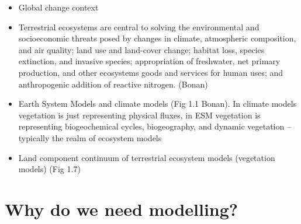 \documentclass[
  oneside]{book}
\providecommand{\tightlist}{%
  \setlength{\itemsep}{0pt}\setlength{\parskip}{0pt}}
\begin{document}
\begin{itemize}
\tightlist
\item
  Global change context
\item
  Terrestrial ecosystems are central to solving the environmental and socioeconomic threats posed by changes in climate, atmospheric composition, and air quality; land use and land-cover change; habitat loss, species extinction, and invasive species; appropriation of freshwater, net primary production, and other ecosystems goods and services for human uses; and anthropogenic addition of reactive nitrogen. (Bonan)
\item
  Earth System Models and climate models (Fig 1.1 Bonan). In climate models vegetation is just representing physical fluxes, in ESM vegetation is representing biogeochemical cycles, biogeography, and dynamic vegetation -- typically the realm of ecosystem models
\item
  Land component continuum of terrestrial ecosystem models (vegetation models) (Fig 1.7)
\end{itemize}

\hypertarget{why-do-we-need-modelling}{%
\section{Why do we need modelling?}\label{why-do-we-need-modelling}}
\end{document}
